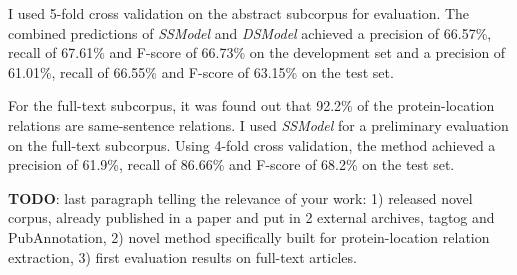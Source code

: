 I used 5-fold cross validation on the abstract subcorpus for evaluation. The combined predictions of \textit{SSModel} and \textit{DSModel} achieved a precision of 66.57\%, recall of 67.61\% and F-score of 66.73\% on the development set and a precision of 61.01\%, recall of 66.55\% and F-score of 63.15\% on the test set.

For the full-text subcorpus, it was found out that 92.2\% of the protein-location relations are same-sentence relations. I used \textit{SSModel} for a preliminary evaluation on the full-text subcorpus. Using 4-fold cross validation, the method achieved a precision of 61.9\%, recall of 86.66\% and F-score of 68.2\% on the test set.

\textbf{TODO}: last paragraph telling the relevance of your work: 1) released novel corpus, already published in a paper and put in 2 external archives, tagtog and PubAnnotation, 2) novel method specifically built for protein-location relation extraction, 3) first evaluation results on full-text articles.